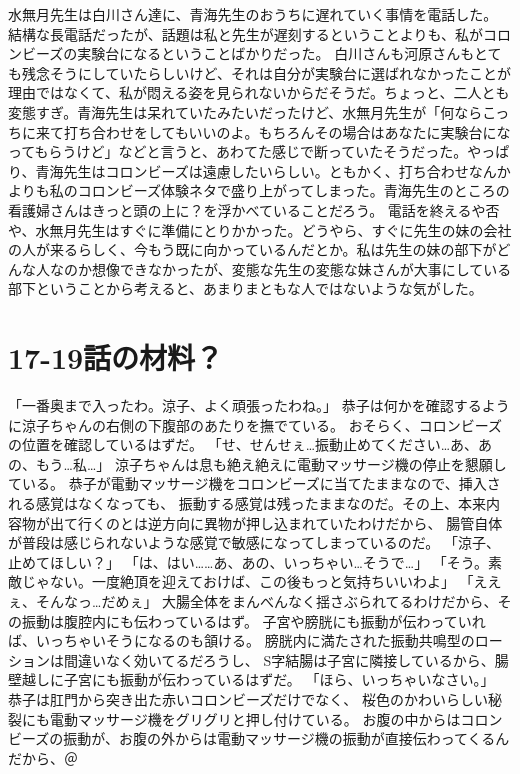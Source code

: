 水無月先生は白川さん達に、青海先生のおうちに遅れていく事情を電話した。
結構な長電話だったが、話題は私と先生が遅刻するということよりも、私がコロンビーズの実験台になるということばかりだった。
白川さんも河原さんもとても残念そうにしていたらしいけど、それは自分が実験台に選ばれなかったことが理由ではなくて、私が悶える姿を見られないからだそうだ。ちょっと、二人とも変態すぎ。青海先生は呆れていたみたいだったけど、水無月先生が「何ならこっちに来て打ち合わせをしてもいいのよ。もちろんその場合はあなたに実験台になってもらうけど」などと言うと、あわてた感じで断っていたそうだった。やっぱり、青海先生はコロンビーズは遠慮したいらしい。ともかく、打ち合わせなんかよりも私のコロンビーズ体験ネタで盛り上がってしまった。青海先生のところの看護婦さんはきっと頭の上に？を浮かべていることだろう。
電話を終えるや否や、水無月先生はすぐに準備にとりかかった。どうやら、すぐに先生の妹の会社の人が来るらしく、今もう既に向かっているんだとか。私は先生の妹の部下がどんな人なのか想像できなかったが、変態な先生の変態な妹さんが大事にしている部下ということから考えると、あまりまともな人ではないような気がした。


\section{17-19話の材料？}
「一番奥まで入ったわ。涼子、よく頑張ったわね。」
恭子は何かを確認するように涼子ちゃんの右側の下腹部のあたりを撫でている。
おそらく、コロンビーズの位置を確認しているはずだ。
「せ、せんせぇ…振動止めてください…あ、あの、もう…私…」
涼子ちゃんは息も絶え絶えに電動マッサージ機の停止を懇願している。
恭子が電動マッサージ機をコロンビーズに当てたままなので、挿入される感覚はなくなっても、
振動する感覚は残ったままなのだ。その上、本来内容物が出て行くのとは逆方向に異物が押し込まれていたわけだから、
腸管自体が普段は感じられないような感覚で敏感になってしまっているのだ。
「涼子、止めてほしい？」
「は、はい……あ、あの、いっちゃい…そうで…」
「そう。素敵じゃない。一度絶頂を迎えておけば、この後もっと気持ちいいわよ」
「ええぇ、そんなっ…だめぇ」
大腸全体をまんべんなく揺さぶられてるわけだから、その振動は腹腔内にも伝わっているはず。
子宮や膀胱にも振動が伝わっていれば、いっちゃいそうになるのも頷ける。
膀胱内に満たされた振動共鳴型のローションは間違いなく効いてるだろうし、
S字結腸は子宮に隣接しているから、腸壁越しに子宮にも振動が伝わっているはずだ。
「ほら、いっちゃいなさい。」
恭子は肛門から突き出た赤いコロンビーズだけでなく、
桜色のかわいらしい秘裂にも電動マッサージ機をグリグリと押し付けている。
お腹の中からはコロンビーズの振動が、お腹の外からは電動マッサージ機の振動が直接伝わってくるんだから、＠

